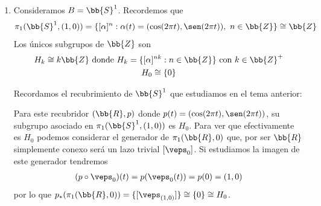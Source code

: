 \begin{ejemplo}
\begin{enumerate}
        por lo que los únicos recubridores de $\bb{R}\bb{P}^2$ son $(\bb{S}^n, p)$ con $p(x)=[x]$ y $(\bb{R}\bb{P}^n, Id_{\bb{R}\bb{P}^n})$.

        \item Consideramos $B=\bb{S}^1$. Recordemos que 
        \begin{gather*}
            \pi_1(\bb{S}^1, (1,0)) = \{[\alpha]^n : \alpha(t) = (\cos(2\pi t), \sen(2\pi t)),\ n\in \bb{Z}\} \cong \bb{Z}
        \end{gather*}
        Los únicos subgrupos de $\bb{Z}$ son 
        \begin{gather*}
            H_k \cong k\bb{Z} \text{ donde } H_k = \{[\alpha]^{nk} : n\in \bb{Z}\} \text{ con } k\in \bb{Z}^+\\
            H_0 \cong \{0\}
        \end{gather*}

        Recordamos el recubrimiento de $\bb{S}^1$ que estudiamos en el tema anterior:

        \begin{figure}[H]
            \centering
        \end{figure}%
        Para este recubridor $(\bb{R}, p)$ donde $p(t) = (\cos(2\pi t), \sen(2\pi t))$, su subgrupo asociado en $\pi_1(\bb{S}^1, (1,0))$ es $H_0$. Para ver que efectivamente es $H_0$ podemos considerar el generador de $\pi_1(\bb{R}, 0)$ que, por ser $\bb{R}$ simplemente conexo será un lazo trivial $[\veps_0]$. Si estudiamos la imagen de este generador tendremos 
        \begin{gather*}
            (p\circ \veps_0)(t) = p(\veps_0(t)) = p(0) = (1,0)
        \end{gather*}
        por lo que $p_*(\pi_1(\bb{R},0)) = \{[\veps_{(1,0)}]\} \cong \{0\}\cong H_0$.\\


\end{enumerate}
\end{ejemplo}
